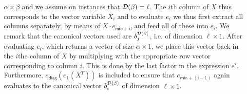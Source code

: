 $\alpha\times\beta$ and we assume on instances that $\mathcal{D}(\beta)=\ell$. The $i$th column of  $X$ thus corresponds to the vector
variable $X_i$ and to evaluate $e_i$ we thus first extract all columns separately, by means of $X\cdot e_{\mathsf{min}+\mathsf{i}}$, and feed all of these into $e_i$.
We remark that the canonical vectors used are $b_{j}^{\mathcal{D}(\beta)}$, i.e. of dimension $\ell\times 1$.
After evaluating $e_i$, which returns a vector of size $\alpha\times 1$, we place this vector back in the $i$the column of $X$ by multiplying with the appropriate
row vector corresponding to column $i$. This is done by the last factor in the expression $e'$. Furthermore, $e_{\mathsf{diag}}(e_{\mathbf{1}}(X^T))$ is included to ensure that
$e_{\mathsf{min} + \mathsf{(i-1)}}$ again evaluates to the canonical vector $b_{i}^{\mathcal{D}(\beta)}$ of dimension $\ell\times 1$.
%
